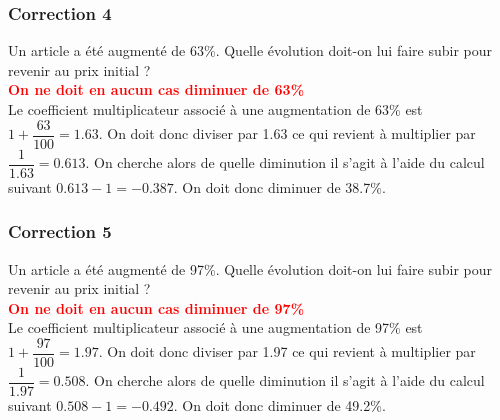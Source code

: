 \documentclass[15pt, mathserif]{beamer}
\begin{document}
\begin{frame}
\vspace{-10mm}
	\frametitle{Correction 4}
\vspace*{1cm} Un article a été augmenté de 63\%. Quelle évolution doit-on lui faire subir pour revenir au prix initial ? \\ \bcattention \textcolor{red}{\textbf{On ne doit en aucun cas diminuer de 63\% }} \\ Le coefficient multiplicateur associé à une augmentation de 63\% est $1+\dfrac{63}{100}=1.63$. On doit donc diviser par 1.63 ce qui revient à multiplier par $\dfrac{1}{1.63}=0.613$. On cherche alors de quelle diminution il s'agit à l'aide du calcul suivant $0.613-1=-0.387$. On doit donc diminuer de 38.7\%. \\ \begin{center}  
  \end{center}\end{frame}


\begin{frame}
\vspace{-10mm}
	\frametitle{Correction 5}
\vspace*{1cm} Un article a été augmenté de 97\%. Quelle évolution doit-on lui faire subir pour revenir au prix initial ? \\ \bcattention \textcolor{red}{\textbf{On ne doit en aucun cas diminuer de 97\% }} \\ Le coefficient multiplicateur associé à une augmentation de 97\% est $1+\dfrac{97}{100}=1.97$. On doit donc diviser par 1.97 ce qui revient à multiplier par $\dfrac{1}{1.97}=0.508$. On cherche alors de quelle diminution il s'agit à l'aide du calcul suivant $0.508-1=-0.492$. On doit donc diminuer de 49.2\%. \\ \begin{center}  
  \end{center}\end{frame}
\end{document}
